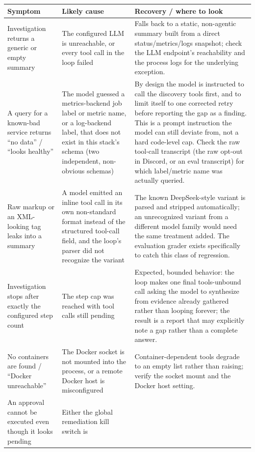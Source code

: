 \documentclass[11pt]{article}
\begin{document}
\begin{longtable}{L{4.1cm} L{4.5cm} L{5.4cm}}
\toprule
\textbf{Symptom} & \textbf{Likely cause} & \textbf{Recovery / where to look} \\
\midrule
\endhead
Investigation returns a generic
or empty summary & The configured LLM is unreachable, or every tool call in
  the loop failed & Falls back to a static, non-agentic summary built from a
  direct status/metrics/logs snapshot; check the LLM endpoint's
  reachability and the process logs for the underlying exception. \\
A query for a known-bad service
returns ``no data'' / ``looks healthy'' & The model guessed a metrics-backend
  job label or metric name, or a log-backend label, that does not
  exist in this stack's schema (two independent, non-obvious schemas) & By
  design the model is instructed to call the discovery tools first, and to
  limit itself to one corrected retry before reporting the gap as a finding.
  This is a prompt instruction the model can still deviate from, not a
  hard code-level cap. Check the raw tool-call transcript (the raw opt-out
  in Discord, or an eval transcript) for which label/metric name was
  actually queried. \\
Raw markup or an XML-looking
tag leaks into a summary & A model emitted an inline tool call in its own
  non-standard format instead of the structured tool-call field, and the
  loop's parser did not recognize the variant & The known DeepSeek-style
  variant is parsed and stripped automatically; an unrecognized variant from
  a different model family would need the same treatment added. The
  \texttt{} evaluation grader exists specifically to catch
  this class of regression. \\
Investigation stops after
exactly the configured step count & The step cap was reached with tool
  calls still pending & Expected, bounded behavior: the loop makes one
  final tools-unbound call asking the model to synthesize from evidence
  already gathered rather than looping forever; the result is a report
  that may explicitly note a gap rather than a complete answer. \\
No containers are found /
``Docker unreachable'' & The Docker socket is not mounted into the process,
  or a remote Docker host is misconfigured & Container-dependent tools
  degrade to an empty list rather than raising; verify the socket mount and
  the Docker host setting. \\
An approval cannot be executed
even though it looks pending & Either the global remediation kill switch is

\end{longtable}
\end{document}

